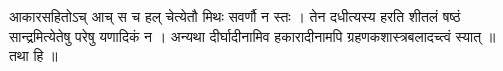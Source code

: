 आकारसहितोऽच् आच् स च हल् चेत्येतौ मिथः सवर्णौ न स्तः । तेन दधीत्यस्य
हरति शीतलं षष्ठं सान्द्रमित्येतेषु परेषु यणादिकं न । अन्यथा
दीर्घादीनामिव हकारादीनामपि ग्रहणकशास्त्रबलादच्त्वं स्यात् ॥ तथा हि ॥
